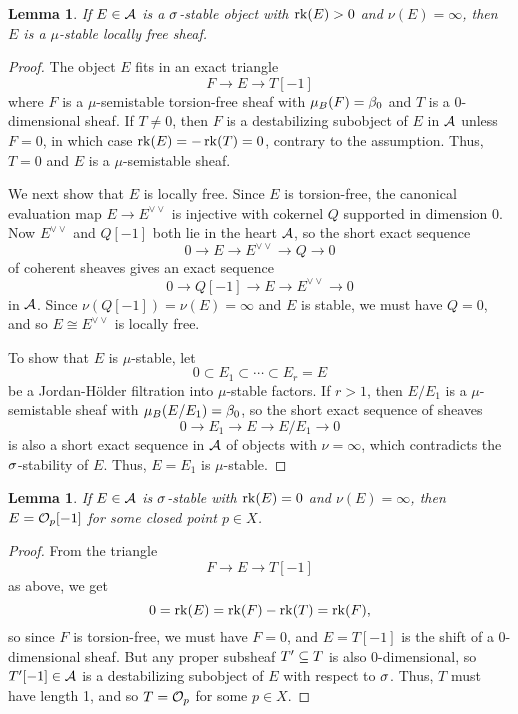 \documentclass[letterpaper,12pt]{amsart}
\newtheorem{lem}[thm]{Lemma}
\theoremstyle{remark}
\begin{document}

\begin{lem}\label{sigmaStablePosRkIsMuStable}
    If $E \in \mathcal{A}$ is a $\sigma$-stable object with $\operatorname{\mathrm{rk}}(E) > 0$ and $\nu(E) = \infty$, then $E$ is a $\mu$-stable locally free sheaf.
\end{lem}
\begin{proof}
    The object $E$ fits in an exact triangle
    \[ F \to E \to T[-1] \]
    where $F$ is a $\mu$-semistable torsion-free sheaf with $\mu_B(F) = \beta_0$ and $T$ is a 0-dimensional sheaf. If $T \neq 0$, then $F$ is a destabilizing subobject of $E$ in $\mathcal{A}$ unless $F = 0$, in which case $\operatorname{\mathrm{rk}}(E) = -\operatorname{\mathrm{rk}}(T) = 0$, contrary to the assumption. Thus, $T = 0$ and $E$ is a $\mu$-semistable sheaf.
    
    We next show that $E$ is locally free. Since $E$ is torsion-free, the canonical evaluation map $E \to E^{\vee \vee}$ is injective with cokernel $Q$ supported in dimension 0. Now $E^{\vee\vee}$ and $Q[-1]$ both lie in the heart $\mathcal{A}$, so the short exact sequence 
    \[ 0 \to E \to E^{\vee \vee} \to Q \to 0 \]
    of coherent sheaves gives an exact sequence
    \[ 0 \to Q[-1] \to E \to E^{\vee \vee} \to 0 \]
    in $\mathcal{A}$. Since $\nu(Q[-1]) = \nu(E) = \infty$ and $E$ is stable, we must have $Q = 0$, and so $E \cong E^{\vee\vee}$ is locally free.
    
    To show that $E$ is $\mu$-stable, let
    \[ 0 \subset E_1 \subset \cdots \subset E_r = E \]
    be a Jordan-H\"older filtration into $\mu$-stable factors. If $r > 1$, then $E/E_1$ is a $\mu$-semistable sheaf with $\mu_B(E/E_1) = \beta_0$, so the short exact sequence of sheaves
    \[ 0 \to E_1 \to E \to E/E_1 \to 0 \]
    is also a short exact sequence in $\mathcal{A}$ of objects with $\nu = \infty$, which contradicts the $\sigma$-stability of $E$. Thus, $E = E_1$ is $\mu$-stable.
\end{proof}

\begin{lem}\label{sigmaStableRk0isSkyscraper}
    If $E \in \mathcal{A}$ is $\sigma$-stable with $\operatorname{\mathrm{rk}}(E) = 0$ and $\nu(E) = \infty$, then $E = \mathcal{O}_p[-1]$ for some closed point $p \in X$.
\end{lem}
\begin{proof}
    From the triangle
    \[ F \to E \to T[-1] \]
    as above, we get 
    \[ 0 = \operatorname{\mathrm{rk}}(E) = \operatorname{\mathrm{rk}}(F) - \operatorname{\mathrm{rk}}(T) = \operatorname{\mathrm{rk}}(F), \]
    so since $F$ is torsion-free, we must have $F = 0$, and $E = T[-1]$ is the shift of a 0-dimensional sheaf. But any proper subsheaf $T' \subseteq T$ is also 0-dimensional, so $T'[-1] \in \mathcal{A}$ is a destabilizing subobject of $E$ with respect to $\sigma$. Thus, $T$ must have length 1, and so $T = \mathcal{O}_p$ for some $p \in X$.
\end{proof}
\end{document}
